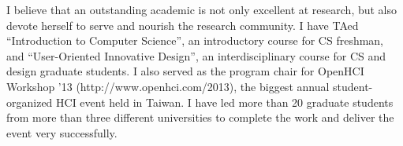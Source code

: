 I believe that an outstanding academic is not only excellent at research, 
but also devote herself to serve and nourish the research community. 
I have TAed ``Introduction to Computer Science'', an introductory course for CS freshman, 
and ``User-Oriented Innovative Design'', an interdisciplinary course for CS and design graduate students. 
I also served as the program chair for OpenHCI Workshop '13 (http://www.openhci.com/2013), 
the biggest annual student-organized HCI event held in Taiwan. 
I have led more than 20 graduate students from more than three different universities to complete the work and deliver the event very successfully.





%


